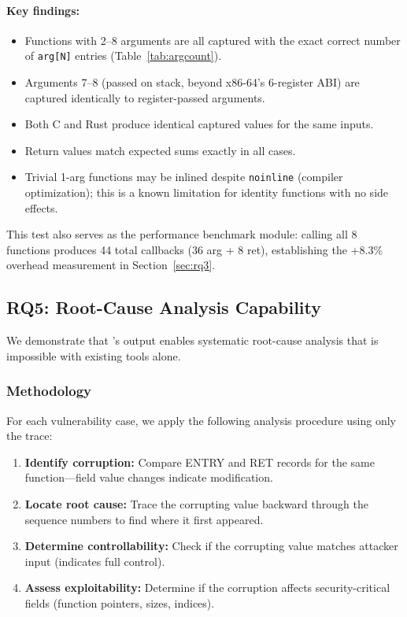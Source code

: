 \documentclass{ndss}
\begin{document}
\paragraph{Key findings:}
\begin{itemize}[nosep]
  \item Functions with 2--8 arguments are all captured with the exact correct
        number of \texttt{arg[N]} entries (Table~\ref{tab:argcount}).
  \item Arguments 7--8 (passed on stack, beyond x86-64's 6-register ABI) are
        captured identically to register-passed arguments.
  \item Both C and Rust produce identical captured values for the same inputs.
  \item Return values match expected sums exactly in all cases.
  \item Trivial 1-arg functions may be inlined despite \texttt{noinline}
        (compiler optimization); this is a known limitation for identity
        functions with no side effects.
\end{itemize}

This test also serves as the performance benchmark module: calling all 8
functions produces 44 total callbacks (36 arg + 8 ret), establishing the
+8.3\% overhead measurement in Section~\ref{sec:rq3}.

\subsection{RQ5: Root-Cause Analysis Capability}\label{sec:rq5}

We demonstrate that \toolname{}'s output enables systematic root-cause analysis
that is impossible with existing tools alone.

\subsubsection{Methodology}

For each vulnerability case, we apply the following analysis procedure using
only the \toolname{} trace:
\begin{enumerate}[nosep]
  \item \textbf{Identify corruption:} Compare ENTRY and RET records for the
        same function---field value changes indicate modification.
  \item \textbf{Locate root cause:} Trace the corrupting value backward
        through the sequence numbers to find where it first appeared.
  \item \textbf{Determine controllability:} Check if the corrupting value
        matches attacker input (indicates full control).
  \item \textbf{Assess exploitability:} Determine if the corruption affects
        security-critical fields (function pointers, sizes, indices).
\end{enumerate}
\end{document}
